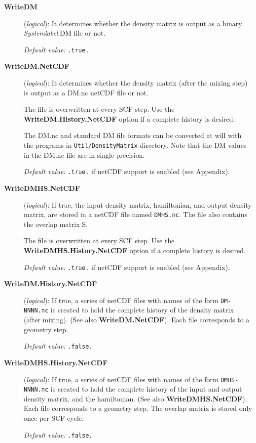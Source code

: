 \documentclass[11pt]{article}
\begin{document}
\begin{description}
\item[{\bf WriteDM}] ({\it logical}): 
 It determines whether the density matrix
is output as a binary {\it Systemlabel}.DM file or not.

{\it Default value:} {\tt .true.}

\item[{\bf WriteDM.NetCDF}] ({\it logical}): 
 It determines whether the density matrix
(after the mixing step) is output as a DM.nc netCDF file or not.

The file is overwritten at every SCF step. Use the {\bf
WriteDM.History.NetCDF} option if a complete history is desired.

The DM.nc and standard DM file formats can be converted at will with
the programs in {\tt Util/DensityMatrix} directory. Note that the
DM values in the DM.nc file are in single precision.

{\it Default value:} {\tt .true.} if netCDF support is enabled (see Appendix).

\item[{\bf WriteDMHS.NetCDF}] ({\it logical}): 
If true, the input density matrix, hamiltonian, and output density matrix, are stored in a netCDF file
named {\tt DMHS.nc}. The file also contains the overlap matrix S. 

The file is overwritten at every SCF step. Use the {\bf
  WriteDMHS.History.NetCDF} option if a complete history is desired.

{\it Default value:} {\tt .true.} if netCDF support is enabled (see Appendix).

\item[{\bf WriteDM.History.NetCDF}] ({\it logical}):
 If
true, a series of netCDF files with names of the form {\tt DM-NNNN.nc}
is created to hold the complete history of the density matrix (after
mixing).  (See also {\bf WriteDM.NetCDF}). Each file corresponds to a
geometry step.

{\it Default value:} {\tt .false.}

\item[{\bf WriteDMHS.History.NetCDF}] ({\it logical}):
 If true, a series of netCDF
files with names of the form {\tt DMHS-NNNN.nc} is created to hold the
complete history of the input and output density matrix, and the
hamiltonian.  (See also {\bf WriteDMHS.NetCDF}). Each file corresponds
to a geometry step. The overlap matrix is stored only once per SCF
cycle.

{\it Default value:} {\tt .false.}

\end{description}
\end{document}
